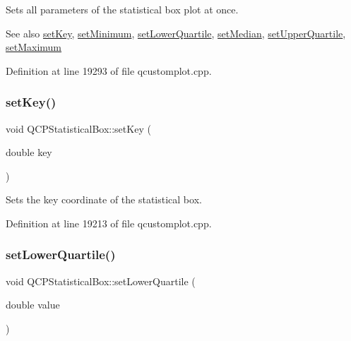 Sets all parameters of the statistical box plot at once.

\begin{DoxySeeAlso}{See also}
\hyperlink{class_q_c_p_statistical_box_a84a1c6d34b2f9af40bca0c527d51e97e}{set\+Key}, \hyperlink{class_q_c_p_statistical_box_a84ff7cc61ba44890f0c3e0c99c19941e}{set\+Minimum}, \hyperlink{class_q_c_p_statistical_box_a680941af5e23d902013962fa67223f9e}{set\+Lower\+Quartile}, \hyperlink{class_q_c_p_statistical_box_a65970e77a897da4ecb4b15300868aad3}{set\+Median}, \hyperlink{class_q_c_p_statistical_box_a65a1375f941c5a2077b5201229e89346}{set\+Upper\+Quartile}, \hyperlink{class_q_c_p_statistical_box_acec5ad1901f00f2c5387cfb4d9787eb3}{set\+Maximum} 
\end{DoxySeeAlso}


Definition at line 19293 of file qcustomplot.\+cpp.

\mbox{\label{class_q_c_p_statistical_box_a84a1c6d34b2f9af40bca0c527d51e97e}} 
\subsubsection{\texorpdfstring{set\+Key()}{setKey()}}
{\footnotesize\ttfamily void Q\+C\+P\+Statistical\+Box\+::set\+Key (\begin{DoxyParamCaption}\item[{double}]{key }\end{DoxyParamCaption})}

Sets the key coordinate of the statistical box. 

Definition at line 19213 of file qcustomplot.\+cpp.

\mbox{\label{class_q_c_p_statistical_box_a680941af5e23d902013962fa67223f9e}} 
\subsubsection{\texorpdfstring{set\+Lower\+Quartile()}{setLowerQuartile()}}
{\footnotesize\ttfamily void Q\+C\+P\+Statistical\+Box\+::set\+Lower\+Quartile (\begin{DoxyParamCaption}\item[{double}]{value }\end{DoxyParamCaption})}

